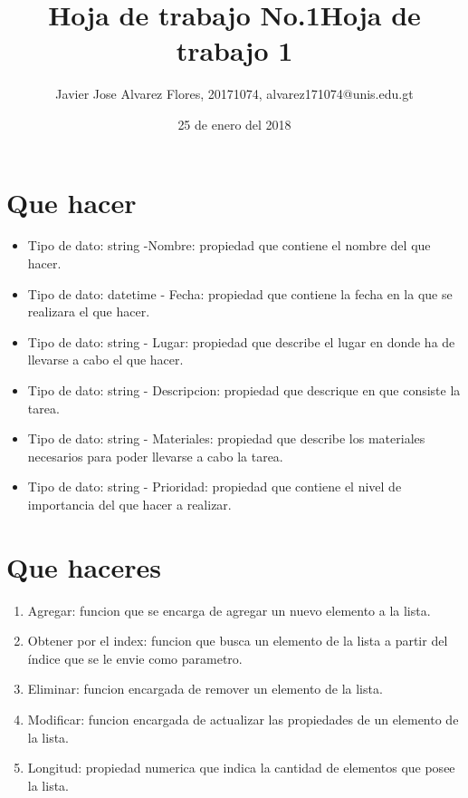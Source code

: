 \documentclass[12pt,a4paper]{article}
\author{Javier Jose Alvarez Flores, 20171074, alvarez171074@unis.edu.gt}
\title{Hoja de trabajo No.1}
\date{25 de enero del 2018}
\begin{document}
\title{Hoja de trabajo 1}
\maketitle{}

\section{Que hacer}
\begin{itemize}

\item Tipo de dato: string  -Nombre: propiedad que contiene el nombre del que hacer.
\item Tipo de dato: datetime - Fecha: propiedad que contiene la fecha en la que se realizara el que hacer.
\item Tipo de dato: string - Lugar: propiedad que describe el lugar en donde ha de llevarse a cabo el que hacer.
\item Tipo de dato: string - Descripcion: propiedad que descrique en que consiste la tarea.
\item Tipo de dato: string - Materiales: propiedad que describe los materiales necesarios para poder llevarse a cabo la tarea.
\item Tipo de dato: string - Prioridad: propiedad que contiene el nivel de importancia del que hacer a realizar.

\end{itemize}

\section{Que haceres}
\begin{enumerate}
\item Agregar: funcion que se encarga de agregar un nuevo elemento a la lista.
\item Obtener por el index: funcion que busca un elemento de la lista a partir del índice que se le envie como parametro.
\item Eliminar: funcion encargada de remover un elemento de la lista.
\item Modificar: funcion encargada de actualizar las propiedades de un elemento de la lista.
\item Longitud: propiedad numerica que indica la cantidad de elementos que posee la lista.
\end{enumerate}
\end{document}
